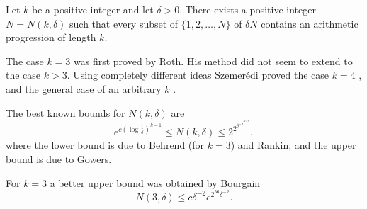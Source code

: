 \documentclass[12pt]{article}
\begin{document}
Let $k$ be a positive integer and let $\delta>0$. There exists a positive integer $N=N(k,\delta)$ such that every subset of $\{1,2,\dotsc,N\}$ of  $\delta N$ contains an arithmetic progression of length $k$.

The case $k=3$ was first proved by Roth\cite{cite:roth_szem_three}. His method did not seem to extend to the case $k>3$. Using completely different ideas Szemer\'edi proved the case $k=4$ \cite{cite:szemeredi_szemth_four}, and the general case of an arbitrary $k$ \cite{cite:szemeredi_szemth_gen}.

The best known bounds for $N(k,\delta)$ are 
\begin{equation*}
e^{c (\log \frac{1}{\delta})^{k-1}}\leq N(k,\delta)\leq 2^{2^{\delta^{-2^{2^{k+9}}}}},
\end{equation*}
where the lower bound is due to Behrend\cite{cite:behrend_szem_low} (for $k=3$) and Rankin\cite{cite:rankin_behrgen}, and the upper bound is due to Gowers\cite{cite:gowers_szem_new_gen}.

For $k=3$ a better upper bound was obtained by Bourgain
\begin{equation*}
N(3,\delta)\leq c \delta^{-2} e^{2^{56} \delta^{-2}}.
\end{equation*}
\end{document}
